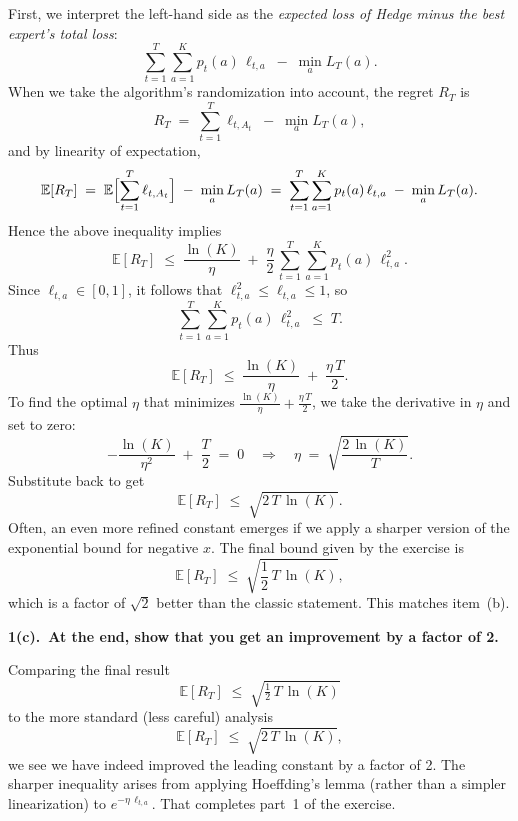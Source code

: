 \noindent
First, we interpret the left-hand side as the \emph{expected loss of Hedge minus the best expert's total loss}:
\[
\sum_{t=1}^T \sum_{a=1}^K p_t(a)\,\ell_{t,a}
\;-\;\min_{a} L_T(a).
\]
When we take the algorithm's randomization into account, the regret $R_T$ is
\[
R_T
\;=\;
\sum_{t=1}^T \ell_{t,A_t}
\;-\;\min_{a} L_T(a),
\]
and by linearity of expectation,
\[
\mathbb{E}[R_T]
\;=\;
\mathbb{E}\Bigl[\sum_{t=1}^T \ell_{t,A_t}\Bigr]
\;-\;\min_{a} L_T(a)
\;=\;
\sum_{t=1}^T \sum_{a=1}^K p_t(a)\,\ell_{t,a}
\;-\;\min_{a} L_T(a).
\]
Hence the above inequality implies
\[
\mathbb{E}[R_T]
\;\le\;
\frac{\ln(K)}{\eta}
\;+\;\frac{\eta}{2}\,\sum_{t=1}^T \sum_{a=1}^K p_t(a)\,\ell_{t,a}^2.
\]
Since $\ell_{t,a}\in[0,1]$, it follows that $\ell_{t,a}^2 \le \ell_{t,a}\le 1$, so 
\[
\sum_{t=1}^T \sum_{a=1}^K p_t(a)\,\ell_{t,a}^2
\;\le\;
T.
\]
Thus
\[
\mathbb{E}[R_T]
\;\le\;
\frac{\ln(K)}{\eta}
\;+\;\frac{\eta\,T}{2}.
\]
To find the optimal $\eta$ that minimizes $\frac{\ln(K)}{\eta} + \tfrac{\eta\,T}{2}$, we take the derivative in $\eta$ and set to zero:
\[
-\frac{\ln(K)}{\eta^2}
\;+\;\frac{T}{2}
\;=\;0
\quad\Longrightarrow\quad
\eta
\;=\;\sqrt{\frac{2\,\ln(K)}{T}}.
\]
Substitute back to get
\[
\mathbb{E}[R_T]
\;\le\;
\sqrt{2\,T\,\ln(K)}.
\]
Often, an even more refined constant emerges if we apply a sharper version of the exponential bound for negative $x$.  The final bound given by the exercise is 
\[
\mathbb{E}[R_T]
\;\le\;
\sqrt{\frac{1}{2}\,T\,\ln(K)},
\]
which is a factor of $\sqrt{2}$ better than the classic statement.  This matches item~(b).

\bigskip

\noindent
\textbf{1(c).~At the end, show that you get an improvement by a factor of 2.}

\noindent
Comparing the final result
\[
\mathbb{E}[R_T] \;\le\;\sqrt{\tfrac12\,T\,\ln(K)}
\]
to the more standard (less careful) analysis
\[
\mathbb{E}[R_T] \;\le\;\sqrt{2\,T\,\ln(K)},
\]
we see we have indeed improved the leading constant by a factor of 2.  The sharper inequality arises from applying Hoeffding's lemma (rather than a simpler linearization) to $e^{-\eta\,\ell_{t,a}}$.  That completes part~1 of the exercise.

\bigskip

